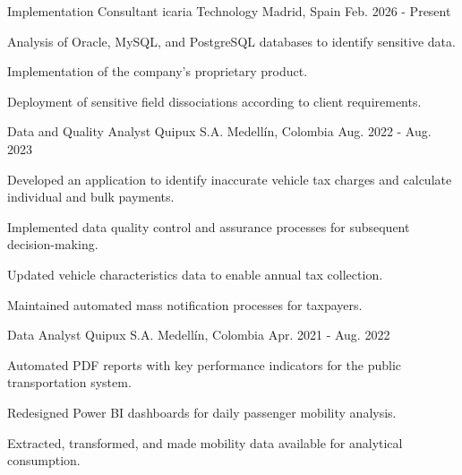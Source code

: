 
\begin{cventries}

\cventry
{Implementation Consultant}
{icaria Technology}
{Madrid, Spain}
{Feb. 2026 - Present}
{
\begin{cvitems}
\item {Analysis of Oracle, MySQL, and PostgreSQL databases to identify sensitive data.}
\item {Implementation of the company's proprietary product.}
\item {Deployment of sensitive field dissociations according to client requirements.\hfill \break}
\end{cvitems}
}

\cventry
{Data and Quality Analyst}
{Quipux S.A.}
{Medellín, Colombia}
{Aug. 2022 - Aug. 2023}
{
\begin{cvitems}
\item {Developed an application to identify inaccurate vehicle tax charges and calculate individual and bulk payments.}
\item {Implemented data quality control and assurance processes for subsequent decision-making.}
\item {Updated vehicle characteristics data to enable annual tax collection.}
\item {Maintained automated mass notification processes for taxpayers.\hfill \break}
\end{cvitems}
}

\cventry
{Data Analyst}
{Quipux S.A.}
{Medellín, Colombia}
{Apr. 2021 - Aug. 2022}
{
\begin{cvitems}
\item {Automated PDF reports with key performance indicators for the public transportation system.}
\item {Redesigned Power BI dashboards for daily passenger mobility analysis.}
\item {Extracted, transformed, and made mobility data available for analytical consumption.}
\end{cvitems}
}

\end{cventries}
